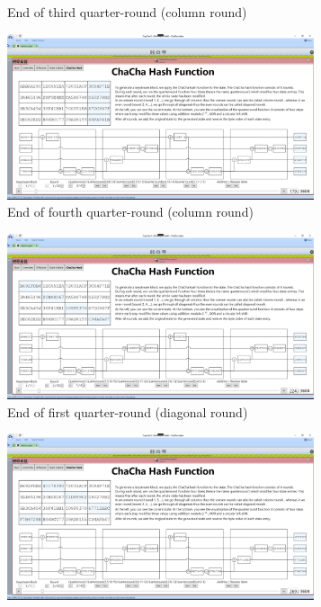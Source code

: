 \begin{figure}
\begin{subfigure}{0.5\textwidth}
  \caption{End of third quarter-round (column round)}
  \label{fig:chachahash.cr.3}
\end{subfigure}%
\begin{subfigure}{0.5\textwidth}
  \centering
  \includegraphics[width=0.99\textwidth]{figures/ct2/chachahash/chachahash-cr4-end.png}
  \caption{End of fourth quarter-round (column round)}
  \label{fig:chachahash.cr.4}
\end{subfigure}
\caption[End of column rounds]{End of each quarter-round execution of a column round}
\label{fig:chachahash.cr}
\centering
\begin{subfigure}{0.5\textwidth}
  \centering
  \includegraphics[width=0.99\textwidth]{figures/ct2/chachahash/chachahash-dr1-end.png}
  \caption{End of first quarter-round (diagonal round)}
  \label{fig:chachahash.dr.1}
\end{subfigure}%
\begin{subfigure}{0.5\textwidth}
  \centering
  \includegraphics[width=0.99\textwidth]{figures/ct2/chachahash/chachahash-dr2-end.png}

\end{subfigure}
\end{figure}
